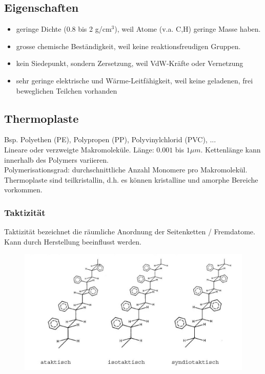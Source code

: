 \subsection{Eigenschaften}
\begin{itemize}
	\item geringe Dichte (0.8 bis 2 g/cm$^3$), weil Atome (v.a. C,H) geringe Masse haben.
	\item grosse chemische Beständigkeit, weil keine reaktionsfreudigen Gruppen.
	\item kein Siedepunkt, sondern Zersetzung, weil VdW-Kräfte oder Vernetzung
	\item sehr geringe elektrische und Wärme-Leitfähigkeit, weil keine geladenen, frei beweglichen Teilchen vorhanden
\end{itemize}

\subsection{Thermoplaste}
Bsp. Polyethen (PE), Polypropen (PP), Polyvinylchlorid (PVC), ... \\

Lineare oder verzweigte Makromoleküle. Länge: $0.001$ bis $1 \mu m$. Kettenlänge kann innerhalb des Polymers variieren. \\

Polymerisationsgrad: durchschnittliche Anzahl Monomere pro Makromolekül. \\

Thermoplaste sind teilkristallin, d.h. es können kristalline und amorphe Bereiche vorkommen.

\subsubsection{Taktizität}
Taktizität bezeichnet die räumliche Anordnung der Seitenketten / Fremdatome. Kann durch Herstellung beeinflusst werden.

\begin{figure}[htbp]
	\centering
	\includegraphics[width=0.7\linewidth]{images/7_Taktizitaet.png}
\end{figure}

